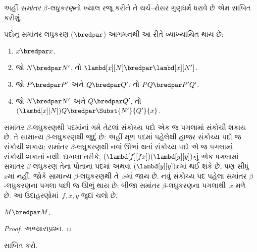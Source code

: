 \documentclass[../../../include/open-logic-section]{subfiles}
\begin{document}


અહીં \emph{સમાંતર $\beta$-લઘુકરણ}નો ખ્યાલ રજૂ કરીને
તે ચર્ચ--રોસર ગુણધર્મ ધરાવે છે એમ સાબિત કરીશું.

\begin{defn} 
  પદોનું સમાંતર લઘુકરણ ($\bredpar$) આગમનથી આ રીતે
  વ્યાખ્યાયિત થાય છે:
  \begin{enumerate}
    \item {} $x \bredpar x$.
    \item {} જો $N \bredpar N'$, તો
      $\lambd[x][N] \bredpar \lambd[x][N']$.
    \item {} જો $P \bredpar P'$ અને
      $Q \bredpar Q'$, તો $PQ \bredpar P'Q'$.
    \item {} જો $N \bredpar N'$ અને
      $Q \bredpar Q'$, તો
      $(\lambd[x][N])Q \bredpar \Subst{N'}{Q'}{x}$.
  \end{enumerate}
\end{defn}

સમાંતર $\beta$-લઘુકરણથી પદમાંનાં ગમે તેટલાં
સંકોચ્ય પદો એક જ પગલામાં સંકોચી શકાય છે. તે સામાન્ય
$\beta$-લઘુકરણથી જુદું છે: અહીં
મૂળ પદમાં પહેલેથી હાજર સંકોચ્ય પદો જ સંકોચી શકાય;
સમાંતર $\beta$-લઘુકરણથી નવાં ઊભાં થતાં સંકોચ્ય પદો એ જ
પગલામાં સંકોચી શકાતાં નથી. દાખલા તરીકે,
$(\lambd[f][fx])(\lambd[y][y])$નું એક પગલામાં
સમાંતર $\beta$-લઘુકરણ તેના પોતાના પદમાં અથવા
$(\lambd[y][y])x$માં થઈ શકે છે, પણ સીધું~$x$માં
નહીં. જોકે સામાન્ય $\beta$-લઘુકરણથી તે~$x$માં
જાય છે. નવું સંકોચ્ય પદ પહેલા સમાંતર $\beta$-લઘુકરણના
પગલા પછી જ ઊભું થાય છે; બીજા સમાંતર $\beta$-લઘુકરણના
પગલાથી~$x$ મળે છે.
આ ઉદાહરણોમાં~$f,x,y$ જુદાં ચલો છે.

\begin{thm}
  $M \bredpar M$.
\end{thm}

\begin{proof}
  અભ્યાસપ્રશ્ન.
\end{proof}

\begin{prob}
   સાબિત કરો.
\end{prob}
\end{document}
